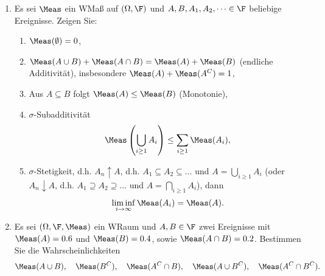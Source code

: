 \begin{enumerate}
	\item Es sei $\Meas$ ein WMaß auf $(\Omega, \F)$ und $A,B,A_1,A_2,\dots \in \F$ beliebige Ereignisse. Zeigen Sie:
	\begin{enumerate}
		\item $\Meas(\emptyset) = 0$,
		\item $\Meas(A\cup B) + \Meas(A\cap B) = \Meas(A) + \Meas(B)$ (endliche Additivität), insbesondere $\Meas(A) + \Meas(A^C) = 1$,
		\item Aus $A \subseteq B$ folgt $\Meas(A) \le \Meas(B)$ (Monotonie),
		\item $\sigma$-Subadditivität
		\begin{align*}
			\Meas\left( \bigcup_{i \ge 1} A_i\right) \le \sum_{i\ge 1} \Meas(A_i),
		\end{align*}
		\item $\sigma$-Stetigkeit, d.h. $A_n \uparrow A$, d.h. $A_1 \subseteq A_2 \subseteq \dots$ und $A = \bigcup_{i \ge 1} A_i$ (oder $A_n \downarrow A$, d.h. $A_1 \supseteq A_2 \supseteq \dots$ und $A = \bigcap_{i \ge 1} A_i$), dann
		\begin{align*}
			\liminf_{i \to \infty} \Meas(A_i) = \Meas(A).
		\end{align*}
	\end{enumerate}
	\item Es sei $(\Omega, \F, \Meas)$ ein WRaum und $A,B \in \F$ zwei Ereignisse mit $\Meas(A) = 0.6$ und $\Meas(B) = 0.4$, sowie $\Meas(A\cap B) = 0.2$. Bestimmen Sie die Wahrscheinlichkeiten
	\begin{align*}
		\Meas(A\cup B), \quad \Meas(B^C), \quad \Meas(A^C \cap B), \quad \Meas(A \cup B^C), \quad \Meas(A^C \cap B^C).
	\end{align*}
\end{enumerate}


